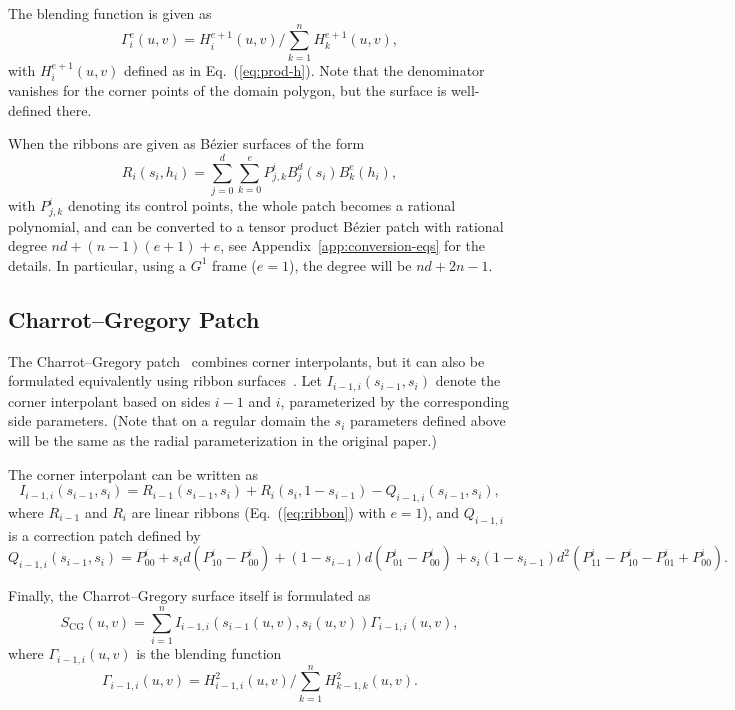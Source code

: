 \documentclass[9pt,academicons]{article}
\begin{document}
The blending function is given as
\begin{equation}
  \Gamma_i^{e}(u,v)=H_i^{e+1}(u,v)\big/\sum_{k=1}^nH_k^{e+1}(u,v),
\end{equation}
with $H_i^{e+1}(u,v)$ defined as in Eq.~(\ref{eq:prod-h}).
Note that the denominator vanishes for the corner points of the domain polygon,
but the surface is well-defined there.

When the ribbons are given as B\'ezier surfaces of the form
\begin{equation}
  \label{eq:ribbon}
  R_i(s_i,h_i)=\sum_{j=0}^d\sum_{k=0}^{e}P_{j,k}^iB_j^d(s_i)B_k^{e}(h_i),
\end{equation}
with $P_{j,k}^i$ denoting its control points,
the whole patch becomes a rational polynomial, and can be converted to
a tensor product B\'ezier patch with rational degree $nd+(n-1)(e+1)+e$,
see Appendix~\ref{app:conversion-eqs} for the details.
In particular, using a $G^1$ frame ($e=1$), the degree will be $nd+2n-1$.

\subsection{Charrot--Gregory Patch}
\label{subsec:charrot}
The Charrot--Gregory patch~\cite{Charrot:1984} combines corner interpolants, but it can
also be formulated equivalently using ribbon surfaces~\cite{Salvi:2014}.
Let $I_{i-1,i}(s_{i-1},s_i)$ denote the corner interpolant based on sides $i-1$ and $i$,
parameterized by the corresponding side parameters.
(Note that on a regular domain the $s_i$ parameters defined above
will be the same as the radial parameterization in the original paper.)

The corner interpolant can be written as
\begin{equation}
  I_{i-1,i}(s_{i-1},s_i)=R_{i-1}(s_{i-1},s_i)+R_i(s_i,1-s_{i-1})-Q_{i-1,i}(s_{i-1},s_i),
\end{equation}
where $R_{i-1}$ and $R_i$ are linear ribbons (Eq.~(\ref{eq:ribbon}) with $e=1$),
and $Q_{i-1,i}$ is a correction patch defined by
\begin{equation}
  Q_{i-1,i}(s_{i-1},s_i)=P_{00}^i+s_id(P_{10}^i-P_{00}^i)+(1-s_{i-1})d(P_{01}^i-P_{00}^i)
  +s_i(1-s_{i-1})d^2(P_{11}^i-P_{10}^i-P_{01}^i+P_{00}^i).
\end{equation}

Finally, the Charrot--Gregory surface itself is formulated as
\begin{equation}
  S_\mathrm{CG}(u,v)=\sum_{i=1}^n I_{i-1,i}(s_{i-1}(u,v),s_i(u,v))\Gamma_{i-1,i}(u,v),
\end{equation}
where $\Gamma_{i-1,i}(u,v)$ is the blending function
\begin{equation}
  \Gamma_{i-1,i}(u,v)=H_{i-1,i}^2(u,v)\big/\sum_{k=1}^nH_{k-1,k}^2(u,v).
\end{equation}
\end{document}
